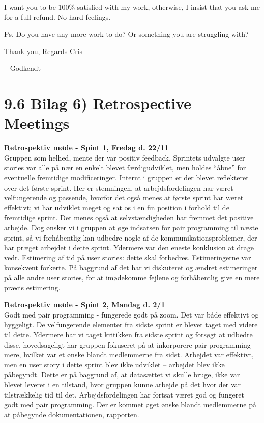 \documentclass[11pt]{report}
\begin{document}
\noindent I want you to be 100\% satisfied with my work, otherwise, I insist that you ask me for a full refund. No hard feelings.

\noindent Ps. Do you have any more work to do? Or something you are struggling with?

\noindent Thank you, Regards Cris

\noindent -- Godkendt


\newpage
\section*{9.6 Bilag 6) Retrospective Meetings}
\noindent\textbf{Retrospektiv møde - Spint 1, Fredag d. 22/11}\\
\noindent Gruppen som helhed, mente der var positiv feedback. Sprintets udvalgte user stories var alle på nær en enkelt blevet færdigudviklet, men holdes “åbne” for eventuelle fremtidige modificeringer. Internt i gruppen er der blevet reflekteret over det første sprint. Her er stemningen, at arbejdsfordelingen har været velfungerende og passende, hvorfor det også menes at første sprint har været effektivt; vi har udviklet meget og sat os i en fin position i forhold til de fremtidige sprint. Det menes også at selvstændigheden har fremmet det positive arbejde. Dog ønsker vi i gruppen at øge indsatsen for pair programming til næste sprint, så vi forhåbentlig kan udbedre nogle af de kommunikationsproblemer, der har præget arbejdet i dette sprint. Ydermere var den eneste konklusion at drage vedr. Estimering af tid på user stories: dette skal forbedres. Estimeringerne var konsekvent forkerte. På baggrund af det har vi diskuteret og ændret estimeringer på alle andre user stories, for at imødekomme fejlene og forhåbentlig give en mere præcis estimering.

\noindent\textbf{Retrospektiv møde - Spint 2, Mandag d. 2/1}\\
\noindent Godt med pair programming - fungerede godt på zoom. Det var både effektivt og hyggeligt. De velfungerende elementer fra sidste sprint er blevet taget med videre til dette. Ydermere har vi taget kritikken fra sidste sprint og forsøgt at udbedre disse, hovedsageligt har gruppen fokuseret på at inkorporere pair programming mere, hvilket var et ønske blandt medlemmerne fra sidst. Arbejdet var effektivt, men en user story i dette sprint blev ikke udviklet -- arbejdet blev ikke påbegyndt. Dette er på baggrund af, at datasættet vi skulle bruge, ikke var blevet leveret i en tilstand, hvor gruppen kunne arbejde på det hvor der var tilstrækkelig tid til det. Arbejdsfordelingen har fortsat været god og fungeret godt med pair programming. Der er kommet øget ønske blandt medlemmerne på at påbegynde dokumentationen, rapporten.
\end{document}

